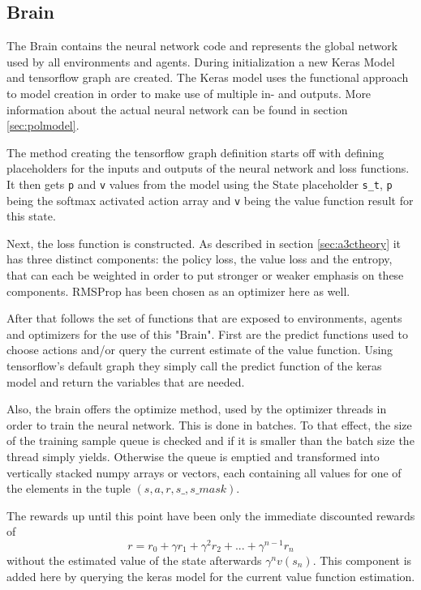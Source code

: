 \subsection{Brain}
\label{sec:brain}
The Brain contains the neural network code and represents the global network used by all environments and agents. During initialization a new Keras Model and tensorflow graph are created. The Keras model uses the functional approach to model creation in order to make use of multiple in- and outputs. More information about the actual neural network can be found in section \ref{sec:polmodel}. 

The method creating the tensorflow graph definition starts off with defining placeholders for the inputs and outputs of the neural network and loss functions. It then gets \lstinline{p} and \lstinline{v} values from the model using the State placeholder \lstinline{s_t}, \lstinline{p} being the softmax activated action array and \lstinline{v} being the value function result for this state.

Next, the loss function is constructed. As described in section \ref{sec:a3ctheory} it has three distinct components: the policy loss, the value loss and the entropy, that can each be weighted in order to put stronger or weaker emphasis on these components. RMSProp has been chosen as an optimizer here as well.

After that follows the set of functions that are exposed to environments, agents and optimizers for the use of this "Brain". First are the predict functions used to choose actions and/or query the current estimate of the value function.
Using tensorflow's default graph they simply call the predict function of the keras model and return the variables that are needed.

Also, the brain offers the optimize method, used by the optimizer threads in order to train the neural network. This is done in batches. To that effect, the size of the training sample queue is checked and if it is smaller than the batch size the thread simply yields. Otherwise the queue is emptied and transformed into vertically stacked numpy arrays or vectors, each containing all values for one of the elements in the tuple $(s,a,r,s\_,s\_mask)$. 

The rewards up until this point have been only the immediate discounted rewards of
$$r = r_0 + \gamma r_1 + \gamma^2 r_2 + ... + \gamma^{n-1}r_n$$
without the estimated value of the state afterwards $\gamma^nv(s_n)$. This component is added here by querying the keras model for the current value function estimation.

